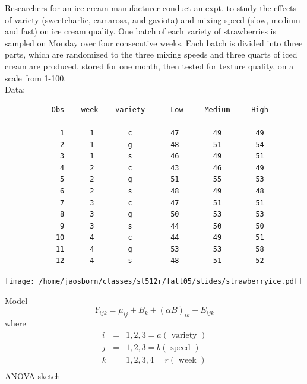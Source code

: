 Researchers for an ice cream manufacturer conduct an expt. to 
study the effects of variety (sweetcharlie, camarosa, and gaviota) and 
mixing speed (slow, medium and fast) on ice cream quality.  
One batch of each variety of strawberries is sampled on Monday 
over four consecutive weeks.  Each batch is divided into three parts, which are 
randomized to the three mixing speeds and three quarts of iced
cream are produced, stored for one month, then tested for
texture quality, on a scale from 1-100. \\

Data:
\begin{small}
\begin{verbatim}
           Obs    week    variety      Low     Medium     High

             1      1        c         47        49        49  
             2      1        g         48        51        54  
             3      1        s         46        49        51  
             4      2        c         43        46        49  
             5      2        g         51        55        53  
             6      2        s         48        49        48  
             7      3        c         47        51        51  
             8      3        g         50        53        53  
             9      3        s         44        50        50  
            10      4        c         44        49        51  
            11      4        g         53        53        58  
            12      4        s         48        51        52  
\end{verbatim}
\end{small}
\begin{center}
\texttt{[image: /home/jaosborn/classes/st512r/fall05/slides/strawberryice.pdf]}
\end{center}
\newpage
\noindent
Model
$$Y_{ijk} = \mu_{ij} + B_k + (\alpha B)_{ik} + E_{ijk} $$
where
\begin{eqnarray*}
i & = & 1,2,3=a (\mbox{ variety })\\
j & = & 1,2,3=b (\mbox{ speed })\\
k & = & 1,2,3,4=r (\mbox{ week })\\
\end{eqnarray*}
ANOVA sketch
